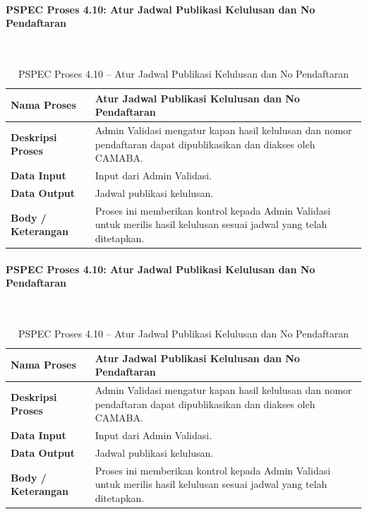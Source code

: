 \paragraph{PSPEC Proses 4.10: Atur Jadwal Publikasi Kelulusan dan No Pendaftaran}~\\
\begin{longtable}{|p{}|p{}|}
\caption{PSPEC Proses 4.10 -- Atur Jadwal Publikasi Kelulusan dan No Pendaftaran}
\label{table:3.pspec410}\\
\hline
\textbf{Nama Proses} & Atur Jadwal Publikasi Kelulusan dan No Pendaftaran \\
\hline
\textbf{Deskripsi Proses} & Admin Validasi mengatur kapan hasil kelulusan dan nomor pendaftaran dapat dipublikasikan dan diakses oleh CAMABA. \\
\hline
\textbf{Data Input} & Input dari Admin Validasi. \\
\hline
\textbf{Data Output} & Jadwal publikasi kelulusan. \\
\hline
\textbf{Body / Keterangan} & Proses ini memberikan kontrol kepada Admin Validasi untuk merilis hasil kelulusan sesuai jadwal yang telah ditetapkan. \\
\hline
\end{longtable}

\paragraph{PSPEC Proses 4.10: Atur Jadwal Publikasi Kelulusan dan No Pendaftaran}~\\
\begin{longtable}{|p{}|p{}|}
\caption{PSPEC Proses 4.10 -- Atur Jadwal Publikasi Kelulusan dan No Pendaftaran}
\label{table:3.pspec410}\\
\hline
\textbf{Nama Proses} & Atur Jadwal Publikasi Kelulusan dan No Pendaftaran \\
\hline
\textbf{Deskripsi Proses} & Admin Validasi mengatur kapan hasil kelulusan dan nomor pendaftaran dapat dipublikasikan dan diakses oleh CAMABA. \\
\hline
\textbf{Data Input} & Input dari Admin Validasi. \\
\hline
\textbf{Data Output} & Jadwal publikasi kelulusan. \\
\hline
\textbf{Body / Keterangan} & Proses ini memberikan kontrol kepada Admin Validasi untuk merilis hasil kelulusan sesuai jadwal yang telah ditetapkan. \\
\hline
\end{longtable}

